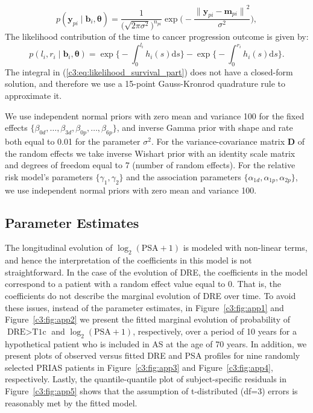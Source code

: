 \begin{subappendices}
\begin{equation*}
p(\boldsymbol{y}_{pi} \mid \boldsymbol{b}_i, \boldsymbol{\theta}) = \frac{1}{\big(\sqrt{2 \pi \sigma^2}\big)^{n_{pi}}} \exp\bigg(-\frac{{\lVert{\boldsymbol{y}_{pi} - \boldsymbol{m}_{pi}}\rVert}^2}{\sigma^2}\bigg),
\end{equation*}
The likelihood contribution of the time to cancer progression outcome is given by:
\begin{equation}
\label{c3:eq:likelihood_survival_part}
p(l_i,r_i\mid \boldsymbol{b}_i,\boldsymbol{\theta}) = \exp\Big\{-\int_0^{l_i} h_i(s)\mathrm{d}{s}\Big\} - \exp\Big\{-\int_0^{r_i}h_i(s)\mathrm{d}{s}\Big\}.
\end{equation}
The integral in (\ref{c3:eq:likelihood_survival_part}) does not have a closed-form solution, and therefore we use a 15-point Gauss-Kronrod quadrature rule to approximate it.

We use independent normal priors with zero mean and variance 100 for the fixed effects ${\{\beta_{0d},\ldots,\beta_{3d}, \beta_{0p},\ldots,\beta_{6p}\}}$, and inverse Gamma prior with shape and rate both equal to 0.01 for the parameter $\sigma^2$. For the variance-covariance matrix $\boldsymbol{D}$ of the random effects we take inverse Wishart prior with an identity scale matrix and degrees of freedom equal to 7 (number of random effects). For the relative risk model's parameters $\{\gamma_1, \gamma_2\}$ and the association parameters $\{\alpha_{1d}, \alpha_{1p}, \alpha_{2p}\}$, we use independent normal priors with zero mean and variance 100.

\subsection{Parameter Estimates}
\label{c3:appendix_subsec:A_paramestimates}
The longitudinal evolution of $\log_2 (\mbox{PSA} + 1)$ is modeled with non-linear terms, and hence the interpretation of the coefficients in this model is not straightforward. In the case of the evolution of DRE, the coefficients in the model correspond to a patient with a random effect value equal to 0. That is, the coefficients do not describe the marginal evolution of DRE over time. To avoid these issues, instead of the parameter estimates, in Figure~\ref{c3:fig:app1} and Figure~\ref{c3:fig:app2} we present the fitted marginal evolution of probability of $\mbox{DRE} > \mbox{T1c}$ and $\log_2 (\mbox{PSA} + 1)$, respectively, over a period of 10 years for a hypothetical patient who is included in AS at the age of 70 years. In addition, we present plots of observed versus fitted DRE and PSA profiles for nine randomly selected PRIAS patients in Figure~\ref{c3:fig:app3} and Figure~\ref{c3:fig:app4}, respectively. Lastly, the quantile-quantile plot of subject-specific residuals in Figure~\ref{c3:fig:app5} shows that the assumption of t-distributed (df=3) errors is reasonably met by the fitted model.


\end{subappendices}
